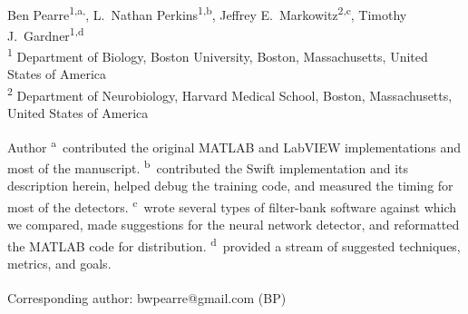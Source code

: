 \documentclass[10pt,letterpaper]{article}
\date{}
\begin{document}
\vspace*{0.35in}

\begin{flushleft}
{\Large
\textbf{}
}
\newline
\\
Ben Pearre\textsuperscript{1,a,\textcurrency},
L.~Nathan Perkins\textsuperscript{1,b},
Jeffrey E.~Markowitz\textsuperscript{2,c},
Timothy J.~Gardner\textsuperscript{1,d}
\\
\bigskip
\textsuperscript{1} Department of Biology, Boston University, Boston, Massachusetts, United States of America\\
\textsuperscript{2} Department of Neurobiology, Harvard Medical School, Boston, Massachusetts, United States of America
\\
\bigskip

% 
%
Author \textsuperscript{a}~contributed the original MATLAB and LabVIEW implementations and most of the manuscript.
\textsuperscript{b}~contributed the Swift implementation and its description herein, helped debug the training code, and measured the timing for most of the detectors.
\textsuperscript{c}~wrote several types of filter-bank software against which we compared, made suggestions for the neural network detector, and reformatted the MATLAB code for distribution.
\textsuperscript{d}~provided a stream of suggested techniques, metrics, and goals.





\textsuperscript{\textcurrency} Corresponding author: bwpearre@gmail.com (BP)

\end{flushleft}
\end{document}

